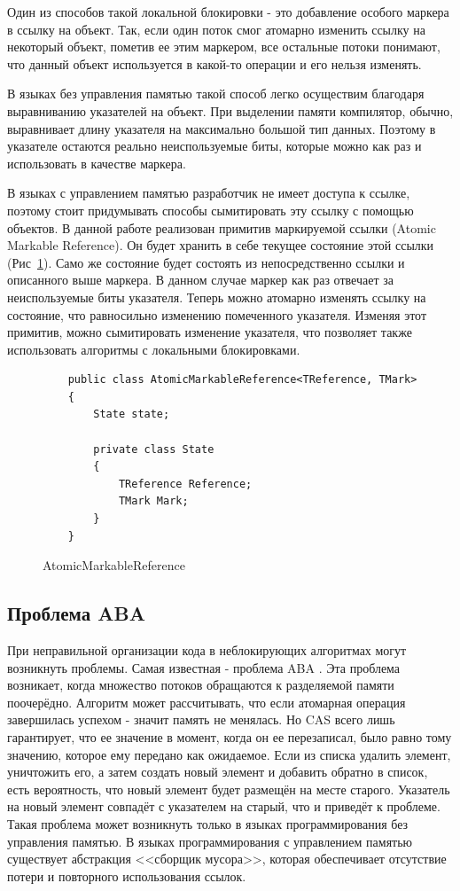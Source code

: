 \documentclass[12pt]{article}
\begin{document}
{				\par Один из способов такой локальной блокировки - это добавление особого маркера в ссылку на объект. Так, если один поток смог атомарно изменить ссылку на некоторый объект, пометив ее этим маркером, все остальные потоки понимают, что данный объект используется в какой-то операции и его нельзя изменять. 
				\par В языках без управления памятью такой способ легко осуществим благодаря выравниванию указателей на объект. При выделении памяти компилятор, обычно, выравнивает длину указателя на максимально большой тип данных. Поэтому в указателе остаются реально неиспользуемые биты, которые можно как раз и использовать в качестве маркера.
				\par В языках с управлением памятью разработчик не имеет доступа к ссылке, поэтому стоит придумывать способы сымитировать эту ссылку с помощью объектов. В данной работе реализован примитив маркируемой ссылки (Atomic Markable Reference). Он будет хранить в себе текущее состояние этой ссылки (Рис~\ref{pic:AMR}). Само же состояние будет состоять из непосредственно ссылки и описанного выше маркера. В данном случае маркер как раз отвечает за неиспользуемые биты указателя. Теперь можно атомарно изменять ссылку на состояние, что равносильно изменению помеченного указателя. Изменяя этот примитив, можно сымитировать изменение указателя, что позволяет также использовать алгоритмы с локальными блокировками. 		
				\begin{figure}[h]
					\begin{lstlisting}
	public class AtomicMarkableReference<TReference, TMark>
	{
		State state;
		
		private class State
		{
			TReference Reference;
			TMark Mark;
		}
	}
					\end{lstlisting}
					\caption{AtomicMarkableReference}
					\label{pic:AMR}
				\end{figure}
			\subsection{Проблема ABA}
				\par При неправильной организации кода в неблокирующих алгоритмах могут возникнуть проблемы. Самая известная - проблема ABA \cite{ABA}. Эта проблема возникает, когда множество потоков обращаются к разделяемой памяти поочерёдно. Алгоритм может рассчитывать, что если атомарная операция завершилась успехом - значит память не менялась. Но CAS всего лишь гарантирует, что ее значение в момент, когда он ее перезаписал, было равно тому значению, которое ему передано как ожидаемое. Если из списка удалить элемент, уничтожить его, а затем создать новый элемент и добавить обратно в список, есть вероятность, что новый элемент будет размещён на месте старого. Указатель на новый элемент совпадёт с указателем на старый, что и приведёт к проблеме. Такая проблема может возникнуть только в языках программирования без управления памятью. В языках программирования с управлением памятью существует абстракция <<сборщик мусора>>, которая обеспечивает отсутствие потери и повторного использования ссылок.
}
\end{document}
